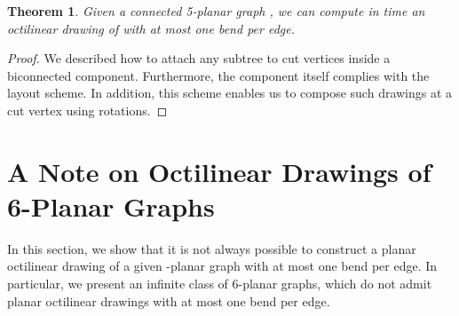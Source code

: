 \documentclass[a4paper,twoside,11pt]{article}
\newtheorem{theorem}{Theorem}
\begin{document}
\begin{theorem}
Given a connected 5-planar graph , we can compute in 
time an octilinear drawing of  with at most one bend per edge.
\label{thm:5planarconnected}
\end{theorem}
\begin{proof}
We described how to attach any subtree to cut vertices inside a
biconnected component. Furthermore, the component itself complies
with the layout scheme. In addition, this scheme enables us to
compose such drawings at a cut vertex using rotations.
\end{proof}

\section{A Note on Octilinear Drawings of 6-Planar Graphs}
\label{sec:6planar}
In this section, we show that it is not always possible to construct
a planar octilinear drawing of a given -planar graph with at most
one bend per edge. In particular, we present an infinite class of
6-planar graphs, which do not admit planar octilinear drawings with
at most one bend per edge.
\end{document}
